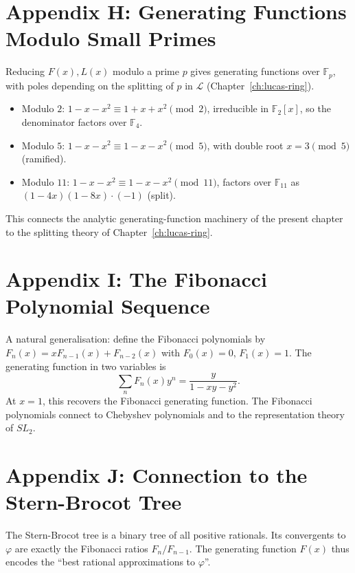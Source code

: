 \section*{Appendix H: Generating Functions Modulo Small Primes}
\label{fa_05:sec:05-app-H}

Reducing $F(x), L(x)$ modulo a prime $p$ gives generating functions
over $\mathbb{F}_p$, with poles depending on the splitting of $p$ in
$\mathcal{L}$ (Chapter~\ref{ch:lucas-ring}).

\begin{itemize}
  \item Modulo $2$: $1 - x - x^2 \equiv 1 + x + x^2 \pmod 2$, irreducible
        in $\mathbb{F}_2[x]$, so the denominator factors over
        $\mathbb{F}_4$.
  \item Modulo $5$: $1 - x - x^2 \equiv 1 - x - x^2 \pmod 5$, with
        double root $x = 3 \pmod 5$ (ramified).
  \item Modulo $11$: $1 - x - x^2 \equiv 1 - x - x^2 \pmod{11}$,
        factors over $\mathbb{F}_{11}$ as $(1 - 4x)(1 - 8x) \cdot (-1)$
        (split).
\end{itemize}

This connects the analytic generating-function machinery of the
present chapter to the splitting theory of Chapter~\ref{ch:lucas-ring}.

\section*{Appendix I: The Fibonacci Polynomial Sequence}
\label{fa_05:sec:05-app-I}

A natural generalisation: define the Fibonacci polynomials by
$F_n(x) = x F_{n-1}(x) + F_{n-2}(x)$ with $F_0(x) = 0$, $F_1(x) = 1$.
The generating function in two variables is
\[
  \sum_n F_n(x) y^n = \frac{y}{1 - xy - y^2}.
\]
At $x = 1$, this recovers the Fibonacci generating function. The
Fibonacci polynomials connect to Chebyshev polynomials and to the
representation theory of $SL_2$.

\section*{Appendix J: Connection to the Stern-Brocot Tree}
\label{fa_05:sec:05-app-J}

The Stern-Brocot tree is a binary tree of all positive rationals.
Its convergents to $\varphi$ are exactly the Fibonacci ratios
$F_n/F_{n-1}$. The generating function $F(x)$ thus encodes the
``best rational approximations to $\varphi$''.

